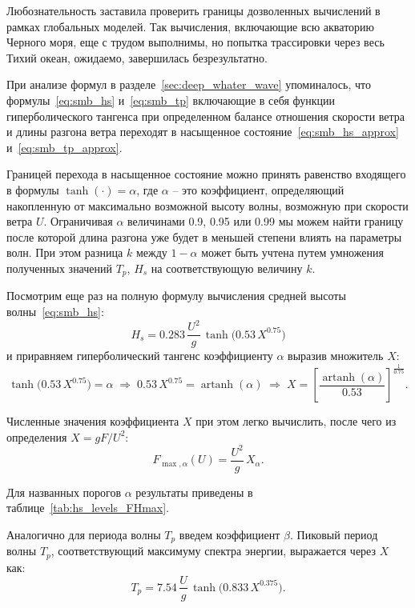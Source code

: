 Любознательность заставила проверить границы дозволенных вычислений в рамках глобальных моделей.
Так вычисления, включающие всю акваторию Черного моря, еще с трудом выполнимы, но попытка трассировки через весь Тихий океан, ожидаемо, завершилась безрезультатно.

При анализе формул в разделе~\ref{sec:deep_whater_wave} упоминалось, что формулы~\eqref{eq:smb_hs} и~\eqref{eq:smb_tp} включающие в себя функции гиперболического тангенса при определенном балансе отношения скорости ветра и длины разгона ветра переходят в насыщенное состояние~\eqref{eq:smb_hs_approx} и~\eqref{eq:smb_tp_approx}.

Границей перехода в насыщенное состояние можно принять равенство входящего в формулы $\tanh(\cdot)=\alpha$, где $\alpha$ -- это коэффициент, определяющий накопленную от максимально возможной высоту волны, возможную при скорости ветра $U$.
Ограничивая $\alpha$ величинами 0.9, 0.95 или 0.99 мы можем найти границу после которой длина разгона уже будет в меньшей степени влиять на параметры волн.
При этом разница $k$ между $1 - \alpha$ может быть учтена путем умножения полученных значений $T_p$, $H_s$ на соответствующую величину $k$.

Посмотрим еще раз на полную формулу вычисления средней высоты волны~\eqref{eq:smb_hs}:
\begin{equation}
    H_s = 0.283\,\frac{U^2}{g}\, \tanh\!\bigl(0.53\,X^{0.75}\bigr)
\end{equation}
и приравняем гиперболический тангенс коэффициенту $\alpha$ выразив множитель $X$:
\begin{equation}
    \tanh\!\bigl(0.53\,X^{0.75}\bigr)=\alpha
    \;\Rightarrow\;
    0.53\,X^{0.75} = \operatorname{artanh}(\alpha)
    \;\Rightarrow\;
    X = \left[\frac{\operatorname{artanh}(\alpha)}{0.53}\right]^{\frac{1}{0.75}}.
\end{equation}

Численные значения коэффициента $X$ при этом легко вычислить, после чего из определения $X = gF/U^2$:
\begin{equation}
    F_{\max,\alpha}(U) = \frac{U^2}{g}\,X_\alpha.
\end{equation}

Для названных порогов $\alpha$ результаты приведены в таблице~\ref{tab:hs_levels_FHmax}.

Аналогично для периода волны $T_p$ введем коэффициент $\beta$.
Пиковый период волны $T_p$, соответствующий максимуму спектра энергии, выражается через $X$ как:
\begin{equation}
    T_p = 7.54\,\frac{U}{g}\, \tanh\!\bigl(0.833\,X^{0.375}\bigr).
\end{equation}


